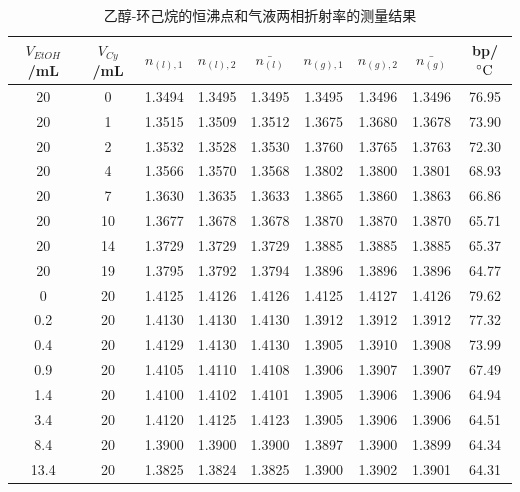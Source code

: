 \documentclass[cn,hazy,pku,12pt,normal,math=newtx,cite=super]{elegantnote}
\begin{document}
\begin{table}[h]
    \centering
    \caption{乙醇-环己烷的恒沸点和气液两相折射率的测量结果}
    \label{04}
    \begin{tabular}{ccccccccc}
    \hline
    $V_{EtOH}$/mL & $V_{Cy}$/mL & $n_{(l),1}$ & $n_{(l),2}$ & $\bar{n_{(l)}}$ & $n_{(g),1}$ & $n_{(g),2}$ & $\bar{n_{(g)}}$ & bp/$\rm \degree C$ \\ \hline
    20   & 0  & 1.3494 & 1.3495 & 1.3495 & 1.3495 & 1.3496 & 1.3496 & 76.95 \\
    20   & 1  & 1.3515 & 1.3509 & 1.3512 & 1.3675 & 1.3680 & 1.3678 & 73.90 \\
    20   & 2  & 1.3532 & 1.3528 & 1.3530 & 1.3760 & 1.3765 & 1.3763 & 72.30 \\
    20   & 4  & 1.3566 & 1.3570 & 1.3568 & 1.3802 & 1.3800 & 1.3801 & 68.93 \\
    20   & 7  & 1.3630 & 1.3635 & 1.3633 & 1.3865 & 1.3860 & 1.3863 & 66.86 \\
    20   & 10 & 1.3677 & 1.3678 & 1.3678 & 1.3870 & 1.3870 & 1.3870 & 65.71 \\
    20   & 14 & 1.3729 & 1.3729 & 1.3729 & 1.3885 & 1.3885 & 1.3885 & 65.37 \\
    20   & 19 & 1.3795 & 1.3792 & 1.3794 & 1.3896 & 1.3896 & 1.3896 & 64.77 \\
    0    & 20 & 1.4125 & 1.4126 & 1.4126 & 1.4125 & 1.4127 & 1.4126 & 79.62 \\
    0.2  & 20 & 1.4130 & 1.4130 & 1.4130 & 1.3912 & 1.3912 & 1.3912 & 77.32 \\
    0.4  & 20 & 1.4129 & 1.4130 & 1.4130 & 1.3905 & 1.3910 & 1.3908 & 73.99 \\
    0.9  & 20 & 1.4105 & 1.4110 & 1.4108 & 1.3906 & 1.3907 & 1.3907 & 67.49 \\
    1.4  & 20 & 1.4100 & 1.4102 & 1.4101 & 1.3905 & 1.3906 & 1.3906 & 64.94 \\
    3.4  & 20 & 1.4120 & 1.4125 & 1.4123 & 1.3905 & 1.3906 & 1.3906 & 64.51 \\
    8.4  & 20 & 1.3900 & 1.3900 & 1.3900 & 1.3897 & 1.3900 & 1.3899 & 64.34 \\
    13.4 & 20 & 1.3825 & 1.3824 & 1.3825 & 1.3900 & 1.3902 & 1.3901 & 64.31 \\ \hline
    \end{tabular}
\end{table}
\end{document}
